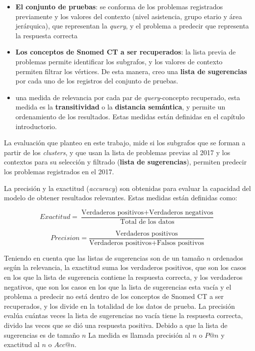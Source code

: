 \begin{itemize}
\item \textbf{El conjunto de pruebas}: se conforma de los problemas registrados previamente y los valores del contexto (nivel asistencia, grupo etario y área jerárquica), que representan la \textit{query}, y el problema a predecir que representa la respuesta correcta
\item \textbf{Los conceptos de Snomed CT a ser recuperados}: la lista previa de problemas permite identificar los subgrafos, y los valores de contexto permiten filtrar los vértices. De esta manera, creo una \textbf{lista de sugerencias} por cada uno de los registros del conjunto de pruebas.
\item una medida de relevancia por cada par de \textit{query}-concepto recuperado, esta medida es la \textbf{transitividad} o la \textbf{distancia semántica}, y permite un ordenamiento de los resultados. Estas medidas están definidas en el capítulo introductorio.
\end{itemize}

La evaluación que planteo en este trabajo, mide si los subgrafos que se forman a partir de los \textit{clusters}, y que usan la lista de problemas previas al 2017 y los contextos para su selección y filtrado (\textbf{lista de sugerencias}), permiten predecir los problemas registrados en el 2017.

La precisión y la exactitud (\textit{accuracy}) son obtenidas para evaluar la capacidad del modelo de obtener resultados relevantes. Estas medidas están definidas como:

\begin{equation}
Exactitud = \frac{\text{Verdaderos positivos}+\text{Verdaderos negativos}}{\text{Total de los datos}}
\end{equation}

\begin{equation}
Precision = \frac{\text{Verdaderos positivos}}{\text{Verdaderos positivos}+\text{Falsos positivos}}
\end{equation}

Teniendo en cuenta que las listas de sugerencias son de un tamaño $n$ ordenados según la relevancia, la exactitud suma los verdaderos positivos, que son los casos en los que la lista de sugerencia contiene la respuesta correcta, y los verdaderos negativos, que son los casos en los que la lista de sugerencias esta vacía y el problema a predecir no está dentro de los conceptos de Snomed CT a ser recuperados, y los divide en la totalidad de los datos de prueba. La precisión evalúa cuántas veces la lista de sugerencias no vacía tiene la respuesta correcta, divido las veces que se dió una respuesta positiva. Debido a que la lista de sugerencias es de tamaño $n$ La medida es llamada precisión al $n$ o $P@n$ y exactitud al $n$ o $Acc@n$.






